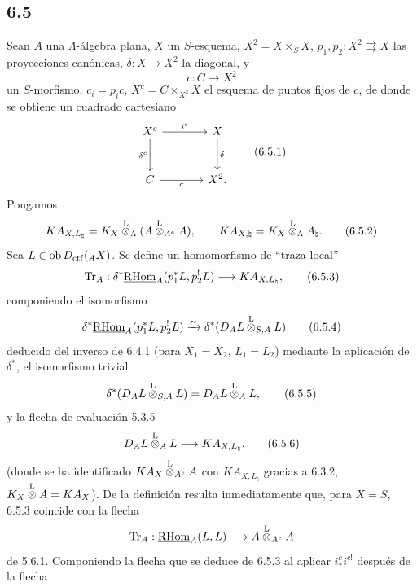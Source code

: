 \subsection*{6.5}
Sean $A$ una $\Lambda$-álgebra plana, $X$ un $S$-esquema, $X^2=X\times_SX$, $p_1,p_2:X^2\rightrightarrows X$ las proyecciones canónicas, $\delta:X\to X^2$ la diagonal, y
\[
c:C\longrightarrow X^2
\]
un $S$-morfismo, $c_i=p_ic$, $X^c=C\times_{X^2}X$ el esquema de puntos fijos de $c$, de donde se obtiene un cuadrado cartesiano
\begin{equation}
\begin{tikzcd}[column sep=large,row sep=large]
X^c \arrow[r,"i^c"] \arrow[d,"\delta^c"'] & X \arrow[d,"\delta"]\\
C \arrow[r,"c"'] & X^2 .
\end{tikzcd}
\tag{6.5.1}
\end{equation}
Pongamos
\begin{equation}
KA_{X,L_{\natural}}=K_X\overset{\mathrm L}{\otimes}_{\Lambda}(A\overset{\mathrm L}{\otimes}_{A^e}A),
\qquad
KA_{X,\natural}=K_X\overset{\mathrm L}{\otimes}_{\Lambda}A_{\natural}.
\tag{6.5.2}
\end{equation}
Sea $L\in\operatorname{ob} D_{\mathrm{ctf}}({}_AX)$. Se define un homomorfismo de ``traza local''
\begin{equation}
\operatorname{Tr}_A:\delta^*\underline{\mathrm{RHom}}_A(p_1^*L,p_2^!L)
\longrightarrow
KA_{X,L_{\natural}},
\tag{6.5.3}
\end{equation}
componiendo el isomorfismo
\begin{equation}
\delta^*\underline{\mathrm{RHom}}_A(p_1^*L,p_2^!L)
\xrightarrow{\sim}
\delta^*(D_AL\overset{\mathrm L}{\otimes}_{S,A}L)
\tag{6.5.4}
\end{equation}
deducido del inverso de 6.4.1 (para $X_1=X_2$, $L_1=L_2$) mediante la aplicación de $\delta^*$, el isomorfismo trivial
\begin{equation}
\delta^*(D_AL\overset{\mathrm L}{\otimes}_{S,A}L)=D_AL\overset{\mathrm L}{\otimes}_AL,
\tag{6.5.5}
\end{equation}
y la flecha de evaluación 5.3.5
\begin{equation}
D_AL\overset{\mathrm L}{\otimes}_AL\longrightarrow KA_{X,L_{\natural}}.
\tag{6.5.6}
\end{equation}
(donde se ha identificado $KA_X\overset{\mathrm L}{\otimes}_{A^e}A$ con $KA_{X,L_{\natural}}$ gracias a 6.3.2, $K_X\overset{\mathrm L}{\otimes} A=KA_X$). De la definición resulta inmediatamente que, para $X=S$, 6.5.3 coincide con la flecha
\[
\operatorname{Tr}_A:\underline{\mathrm{RHom}}_A(L,L)\longrightarrow A\overset{\mathrm L}{\otimes}_{A^e}A
\]
de 5.6.1. Componiendo la flecha que se deduce de 6.5.3 al aplicar $i_*^ci^{c!}$ después de la flecha
